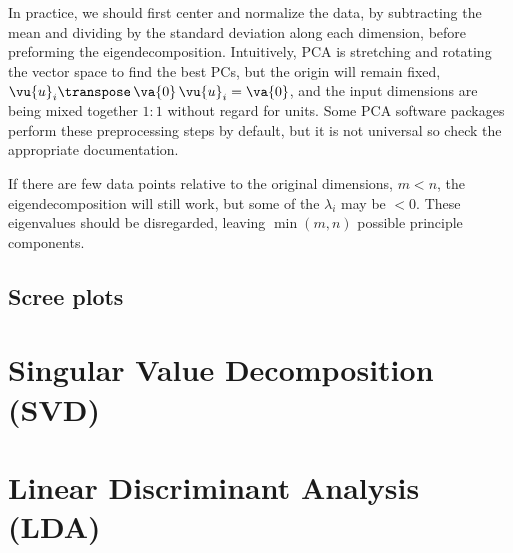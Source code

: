 In practice, we should first center and normalize the data,
by subtracting the mean and dividing by the standard deviation along each dimension,
before preforming the eigendecomposition.
Intuitively, PCA is stretching and rotating the vector space to find the best PCs,
but the origin will remain fixed, $\vu{u}_{i}\transpose\,\va{0}\,\vu{u}_{i} = \va{0}$,
and the input dimensions are being mixed together $1 \mathbin{:} 1$ without regard for units.
Some PCA software packages perform these preprocessing steps by default,
but it is not universal so check the appropriate documentation.

If there are few data points relative to the original dimensions, $m < n$,
the eigendecomposition will still work, but some of the $\lambda_{i}$ may be $< 0$.
These eigenvalues should be disregarded, leaving $\min\left(m,n\right)$ possible principle components.


\subsection{Scree plots}
\label{dim_reduct:PCA:Scree}

\section{Singular Value Decomposition (SVD)}
\label{dim_reduct:SVD}

\section{Linear Discriminant Analysis (LDA)}
\label{dim_reduct:LDA}


